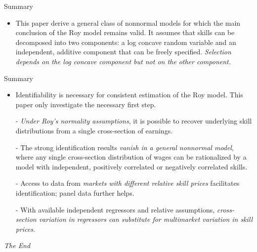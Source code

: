 \documentclass{beamer}
\begin{document}
\begin{frame}{Summary}
	\begin{itemize}
		\item This paper derive a general class of nonnormal models for which the main conclusion of the Roy model remains valid. It assumes that skills can be decomposed into two components: a log concave random variable and an independent, additive component that can be freely specified. \textit{Selection depends on the log concave component but not on the other component.}

	\end{itemize}
\end{frame}
\begin{frame}{Summary}
	\begin{itemize}
		\item Identifiability is necessary for consistent estimation of the Roy model. This paper only investigate the necessary first step.
		\item [-] \textit{Under Roy's normality assumptions}, it is possible to recover underlying skill distributions from a single cross-section of earnings.
		\item [-] The strong identification results \textit{vanish in a general nonnormal model}, where any single cross-section distribution of wages can be rationalized by a model with independent, positively correlated or negatively correlated skills.
		\item [-] Access to data from \textit{markets with different relative skill prices} facilitates identification; panel data further helps.
		\item [-] With available independent regressors and relative assumptions, \textit{cross-section variation in regressors can substitute for multimarket variation in skill prices}.
	\end{itemize}
\end{frame}


\begin{frame}
\Huge{\centerline{\textit{The End}}}
\end{frame}
\end{document}
